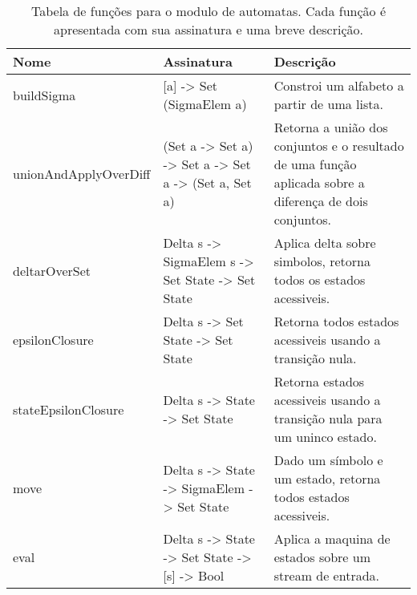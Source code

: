 \begin{table}
  \begin{tabular}{lll}
  \hline
  Nome & Assinatura & Descrição \\
  \hline
  buildSigma & [a] -> Set (SigmaElem a) &  Constroi um alfabeto a partir de uma lista. \\
  unionAndApplyOverDiff & (Set a -> Set a) -> Set a -> Set a -> (Set a, Set a) & Retorna a união dos conjuntos e o resultado de uma função aplicada sobre a diferença de dois conjuntos. \\
  deltarOverSet & Delta s -> SigmaElem s -> Set State -> Set State & Aplica delta sobre simbolos, retorna todos os estados acessiveis. \\
  epsilonClosure & Delta s -> Set State -> Set State & Retorna todos estados acessiveis usando a transição nula.\\
  stateEpsilonClosure & Delta s -> State -> Set State & Retorna estados acessiveis usando a transição nula para um uninco estado. \\
  move & Delta s -> State -> SigmaElem -> Set State & Dado um símbolo e um estado, retorna todos estados acessiveis. \\
  eval & Delta s -> State -> Set State -> [s] -> Bool & Aplica a maquina de estados sobre um stream de entrada.\\
 \hline
  \end{tabular}
\caption{Tabela de funções para o modulo de automatas. Cada função é apresentada com sua assinatura e uma breve descrição.}
\label{t-automata-funcs}
\end{table}
